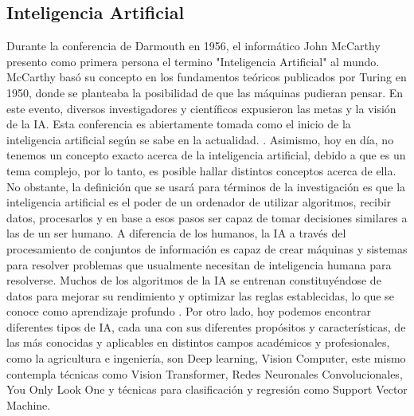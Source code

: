 \subsection{Inteligencia Artificial}
 Durante la conferencia de Darmouth en 1956, el informático John McCarthy presento como primera persona el termino "Inteligencia Artificial" al mundo. McCarthy basó su concepto en los fundamentos teóricos publicados por Turing en 1950, donde se planteaba la posibilidad de que las máquinas pudieran pensar. En este evento, diversos investigadores y científicos expusieron las metas y la visión de la IA. Esta conferencia es abiertamente tomada como el inicio de la inteligencia artificial según se sabe en la actualidad. \parencite{teamredac2022}.
 Asimismo, hoy en día, no tenemos un concepto exacto acerca de la inteligencia artificial, debido a que es un tema complejo, por lo tanto, es posible hallar distintos conceptos acerca de ella. No obstante, la definición que se usará para términos de la investigación es que la inteligencia artificial es el poder de un ordenador de utilizar algoritmos, recibir datos, procesarlos y en base a esos pasos ser capaz de tomar decisiones similares a las de un ser humano. A diferencia de los humanos, la IA a través del procesamiento de conjuntos de información es capaz de crear máquinas y sistemas para resolver problemas que usualmente necesitan de inteligencia humana para resolverse. Muchos de los algoritmos de la IA se entrenan constituyéndose de datos para mejorar su rendimiento y optimizar las reglas establecidas, lo que se conoce como aprendizaje profundo \parencites{rouhiainen2018inteligencia}{ricardo2021inteligencia}{cajahuanca2021inteligencia}. 
 Por otro lado, hoy podemos encontrar diferentes tipos de IA, cada una con sus diferentes propósitos y características, de las más conocidas y aplicables en distintos campos académicos y profesionales, como la agricultura e ingeniería, son  Deep learning,  Vision Computer, este mismo contempla técnicas como Vision Transformer, Redes Neuronales Convolucionales, You Only Look One y técnicas para clasificación y regresión como Support Vector Machine.
 
